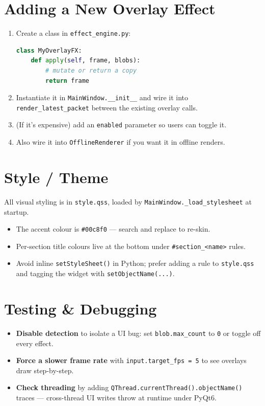 \documentclass[11pt,a4paper,openany]{report}
\begin{document}
\section{Adding a New Overlay Effect}

\begin{enumerate}
    \item Create a class in \texttt{effect\_engine.py}:
\begin{lstlisting}[language=Python]
class MyOverlayFX:
    def apply(self, frame, blobs):
        # mutate or return a copy
        return frame
\end{lstlisting}
    \item Instantiate it in \texttt{MainWindow.\_\_init\_\_} and wire it
        into \texttt{render\_latest\_packet} between the existing overlay
        calls.
    \item (If it's expensive) add an \texttt{enabled} parameter so users
        can toggle it.
    \item Also wire it into \texttt{OfflineRenderer} if you want it in
        offline renders.
\end{enumerate}

\section{Style / Theme}

All visual styling is in \texttt{style.qss}, loaded by
\texttt{MainWindow.\_load\_stylesheet} at startup.

\begin{itemize}
    \item The accent colour is \texttt{\#00c8f0} --- search and replace to
        re-skin.
    \item Per-section title colours live at the bottom under
        \texttt{\#section\_<name>} rules.
    \item Avoid inline \texttt{setStyleSheet()} in Python; prefer adding a
        rule to \texttt{style.qss} and tagging the widget with
        \texttt{setObjectName(...)}.
\end{itemize}

\section{Testing \& Debugging}

\begin{itemize}
    \item \textbf{Disable detection} to isolate a UI bug: set
        \texttt{blob.max\_count} to \texttt{0} or toggle off every effect.
    \item \textbf{Force a slower frame rate} with
        \texttt{input.target\_fps = 5} to see overlays draw step-by-step.
    \item \textbf{Check threading} by adding
        \texttt{QThread.currentThread().objectName()} traces --- cross-thread
        UI writes throw at runtime under PyQt6.
\end{itemize}
\end{document}
